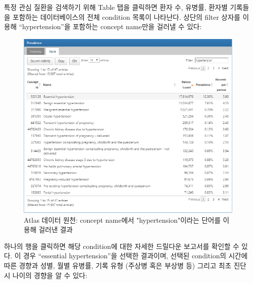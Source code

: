 \documentclass[11pt]{book}
\theoremstyle{definition}
\theoremstyle{definition}
\theoremstyle{definition}
\theoremstyle{remark}
\begin{document}
특정 관심 질환을 검색하기 위해 Table 탭을 클릭하면 환자 수, 유병률,
환자별 기록들을 포함하는 데이터베이스의 전체 condition 목록이 나타난다.
상단의 filter 상자를 이용해 ``hypertension''을 포함하는 concept name만을
걸러낼 수 있다:

\begin{figure}

{\centering \includegraphics[width=1\linewidth]{images/Characterization/atlasDataSourcesConditionFiltered} 

}

\caption{Atlas 데이터 원천: concept name에서 "hypertension"이라는 단어를 이용해 걸러낸 결과}\label{fig:atlasDataSourcesConditionFiltered}
\end{figure}

하나의 행을 클릭하면 해당 condition에 대한 자세한 드릴다운 보고서를
확인할 수 있다. 이 경우 ``essential hypertension''을 선택한 결과이며,
선택된 condition의 시간에 따른 경향과 성별, 월별 유병률, 기록 유형
(주상병 혹은 부상병 등) 그리고 최초 진단 시 나이의 경향을 알 수 있다:
\end{document}
